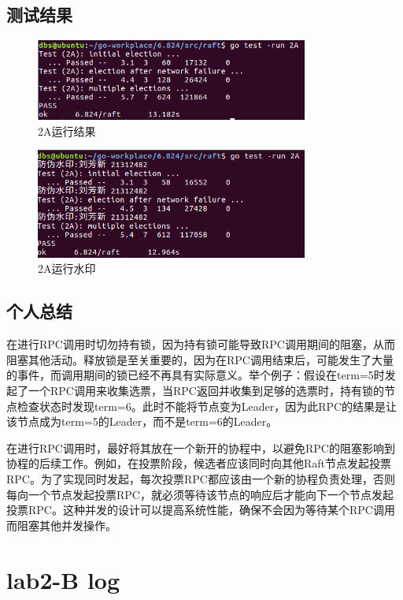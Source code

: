 \documentclass[]{article}
\begin{document}
	\subsection{测试结果}
	\begin{figure}[H]
		\centering
		\includegraphics[width=0.8\textwidth]{./2A/2A result.png}
		\caption{2A运行结果}
	\end{figure}
	\begin{figure}[H]
		\centering
		\includegraphics[width=0.8\textwidth]{./2A/2A result1.png}
		\caption{2A运行水印}
	\end{figure}
	\subsection{个人总结}
	在进行RPC调用时切勿持有锁，因为持有锁可能导致RPC调用期间的阻塞，从而阻塞其他活动。释放锁是至关重要的，因为在RPC调用结束后，可能发生了大量的事件，而调用期间的锁已经不再具有实际意义。举个例子：假设在term=5时发起了一个RPC调用来收集选票，当RPC返回并收集到足够的选票时，持有锁的节点检查状态时发现term=6。此时不能将节点变为Leader，因为此RPC的结果是让该节点成为term=5的Leader，而不是term=6的Leader。
	
	在进行RPC调用时，最好将其放在一个新开的协程中，以避免RPC的阻塞影响到协程的后续工作。例如，在投票阶段，候选者应该同时向其他Raft节点发起投票RPC。为了实现同时发起，每次投票RPC都应该由一个新的协程负责处理，否则每向一个节点发起投票RPC，就必须等待该节点的响应后才能向下一个节点发起投票RPC。这种并发的设计可以提高系统性能，确保不会因为等待某个RPC调用而阻塞其他并发操作。
	
	\section{lab2-B log}
\end{document}
